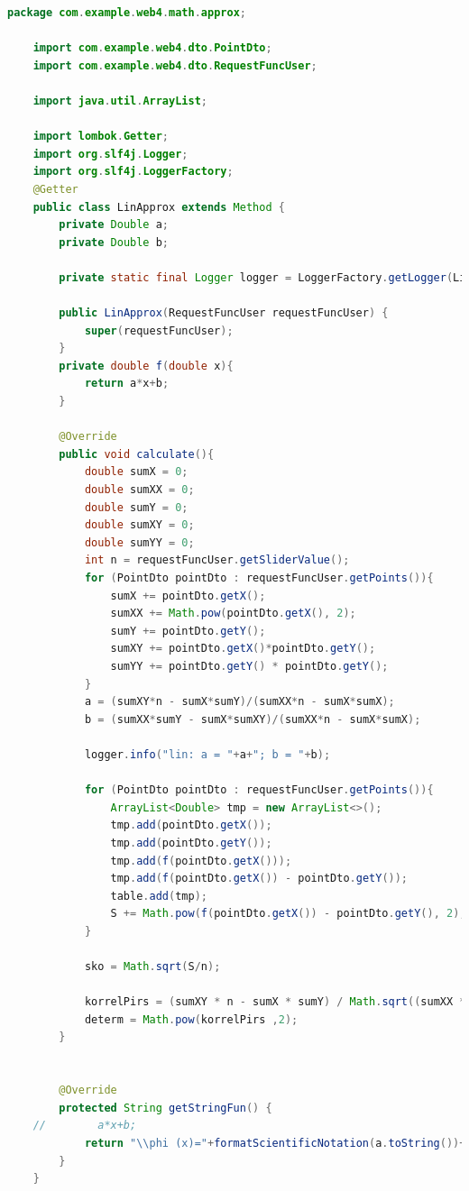 \documentclass{article}
\begin{document}
\begin{lstlisting}[language=Java, caption={Линейная аппроксимация}]
    package com.example.web4.math.approx;

    import com.example.web4.dto.PointDto;
    import com.example.web4.dto.RequestFuncUser;
    
    import java.util.ArrayList;
    
    import lombok.Getter;
    import org.slf4j.Logger;
    import org.slf4j.LoggerFactory;
    @Getter
    public class LinApprox extends Method {
        private Double a;
        private Double b;
    
        private static final Logger logger = LoggerFactory.getLogger(LinApprox.class);
    
        public LinApprox(RequestFuncUser requestFuncUser) {
            super(requestFuncUser);
        }
        private double f(double x){
            return a*x+b;
        }
    
        @Override
        public void calculate(){
            double sumX = 0;
            double sumXX = 0;
            double sumY = 0;
            double sumXY = 0;
            double sumYY = 0;
            int n = requestFuncUser.getSliderValue();
            for (PointDto pointDto : requestFuncUser.getPoints()){
                sumX += pointDto.getX();
                sumXX += Math.pow(pointDto.getX(), 2);
                sumY += pointDto.getY();
                sumXY += pointDto.getX()*pointDto.getY();
                sumYY += pointDto.getY() * pointDto.getY();
            }
            a = (sumXY*n - sumX*sumY)/(sumXX*n - sumX*sumX);
            b = (sumXX*sumY - sumX*sumXY)/(sumXX*n - sumX*sumX);
    
            logger.info("lin: a = "+a+"; b = "+b);
    
            for (PointDto pointDto : requestFuncUser.getPoints()){
                ArrayList<Double> tmp = new ArrayList<>();
                tmp.add(pointDto.getX());
                tmp.add(pointDto.getY());
                tmp.add(f(pointDto.getX()));
                tmp.add(f(pointDto.getX()) - pointDto.getY());
                table.add(tmp);
                S += Math.pow(f(pointDto.getX()) - pointDto.getY(), 2);
            }
    
            sko = Math.sqrt(S/n);
    
            korrelPirs = (sumXY * n - sumX * sumY) / Math.sqrt((sumXX * n - sumX * sumX) * (sumYY * n - sumY * sumY));
            determ = Math.pow(korrelPirs ,2);
        }
    
    
        @Override
        protected String getStringFun() {
    //        a*x+b;
            return "\\phi (x)="+formatScientificNotation(a.toString())+"\\cdot x+"+formatScientificNotation(b.toString());
        }
    }
    
    
\end{lstlisting}
\end{document}
